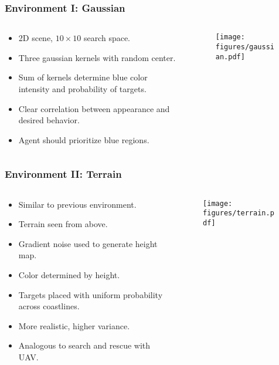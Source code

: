 \begin{frame}
    \frametitle{Environment I: Gaussian}
    \begin{columns}
        \begin{column}{0.5\textwidth}
            \begin{itemize}
                \item 2D scene, \(10 \times 10\) search space.
                \item Three gaussian kernels with random center.
                \item Sum of kernels determine blue color intensity and probability of targets.
                \item Clear correlation between appearance and desired behavior.
                \item Agent should prioritize blue regions.
            \end{itemize}
        \end{column}
        \begin{column}{0.5\textwidth}
            \begin{figure}
                \centering
                \texttt{[image: figures/gaussian.pdf]}
            \end{figure}
        \end{column}
    \end{columns}    
\end{frame}

\begin{frame}
    \frametitle{Environment II: Terrain}
    \begin{columns}
        \begin{column}{0.5\textwidth}
            \begin{itemize}
                \item Similar to previous environment.
                \item Terrain seen from above.
                \item Gradient noise used to generate height map.
                \item Color determined by height.
                \item Targets placed with uniform probability across coastlines.
                \item More realistic, higher variance.
                \item Analogous to search and rescue with UAV.
            \end{itemize}
        \end{column}
        \begin{column}{0.5\textwidth}
            \begin{figure}
                \centering
                \texttt{[image: figures/terrain.pdf]}
            \end{figure}
        \end{column}
    \end{columns}   
\end{frame}

